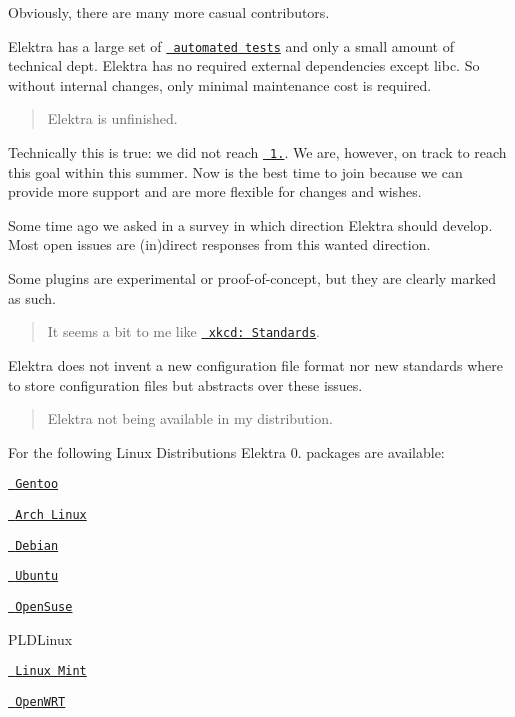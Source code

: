 Obviously, there are many more casual contributors.

Elektra has a large set of \href{https://build.libelektra.org}{\texttt{ automated tests}} and only a small amount of technical dept. Elektra has no required external dependencies except libc. So without internal changes, only minimal maintenance cost is required.

\begin{quote}
Elektra is unfinished. \end{quote}


Technically this is true\+: we did not reach \href{https://git.libelektra.org/milestone/12}{\texttt{ 1.}}. We are, however, on track to reach this goal within this summer. Now is the best time to join because we can provide more support and are more flexible for changes and wishes.

Some time ago we asked in a survey in which direction Elektra should develop. Most open issues are (in)direct responses from this wanted direction.

Some plugins are experimental or proof-\/of-\/concept, but they are clearly marked as such.

\begin{quote}
It seems a bit to me like \href{https://xkcd.com/927/}{\texttt{ xkcd\+: Standards}}. \end{quote}


Elektra does not invent a new configuration file format nor new standards where to store configuration files but abstracts over these issues.

\begin{quote}
Elektra not being available in my distribution. \end{quote}


For the following Linux Distributions Elektra 0. packages are available\+:


\begin{DoxyItemize}
\item \href{http://packages.gentoo.org/package/app-admin/elektra}{\texttt{ Gentoo}}
\item \href{https://aur.archlinux.org/packages/elektra/}{\texttt{ Arch Linux}}
\item \href{https://packages.debian.org/de/jessie/libelektra4}{\texttt{ Debian}}
\item \href{https://launchpad.net/ubuntu/+source/elektra}{\texttt{ Ubuntu}}
\item \href{https://software.opensuse.org/package/elektra}{\texttt{ Open\+Suse}}
\item P\+L\+D\+Linux
\item \href{https://community.linuxmint.com/software/view/elektra-bin}{\texttt{ Linux Mint}}
\item \href{https://openwrt.org/packages/pkgdata/libelektra-core?s[]=elektra}{\texttt{ Open\+W\+RT}}
\end{DoxyItemize}

